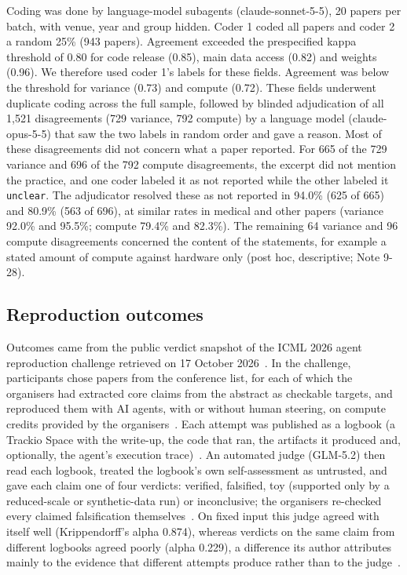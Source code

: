 \documentclass[11pt]{article}
\begin{document}
Coding was done by language-model subagents (claude-sonnet-5-5), 20 papers per batch, with venue, year and group hidden. Coder 1 coded all papers and coder 2 a random 25\% (943 papers). Agreement exceeded the prespecified kappa threshold of 0.80 for code release (0.85), main data access (0.82) and weights (0.96). We therefore used coder 1's labels for these fields. Agreement was below the threshold for variance (0.73) and compute (0.72). These fields underwent duplicate coding across the full sample, followed by blinded adjudication of all 1,521 disagreements (729 variance, 792 compute) by a language model (claude-opus-5-5) that saw the two labels in random order and gave a reason. Most of these disagreements did not concern what a paper reported. For 665 of the 729 variance and 696 of the 792 compute disagreements, the excerpt did not mention the practice, and one coder labeled it as not reported while the other labeled it \texttt{unclear}. The adjudicator resolved these as not reported in 94.0\% (625 of 665) and 80.9\% (563 of 696), at similar rates in medical and other papers (variance 92.0\% and 95.5\%; compute 79.4\% and 82.3\%). The remaining 64 variance and 96 compute disagreements concerned the content of the statements, for example a stated amount of compute against hardware only (post hoc, descriptive; Note 9-28).

\subsection*{Reproduction outcomes}
Outcomes came from the public verdict snapshot of the ICML 2026 agent reproduction challenge retrieved on 17 October 2026~\cite{r9}. In the challenge, participants chose papers from the conference list, for each of which the organisers had extracted core claims from the abstract as checkable targets, and reproduced them with AI agents, with or without human steering, on compute credits provided by the organisers~\cite{r9}. Each attempt was published as a logbook (a Trackio Space with the write-up, the code that ran, the artifacts it produced and, optionally, the agent's execution trace)~\cite{r9}. An automated judge (GLM-5.2) then read each logbook, treated the logbook's own self-assessment as untrusted, and gave each claim one of four verdicts: verified, falsified, toy (supported only by a reduced-scale or synthetic-data run) or inconclusive; the organisers re-checked every claimed falsification themselves~\cite{r9}. On fixed input this judge agreed with itself well (Krippendorff's alpha 0.874), whereas verdicts on the same claim from different logbooks agreed poorly (alpha 0.229), a difference its author attributes mainly to the evidence that different attempts produce rather than to the judge~\cite{r13}.
\end{document}
